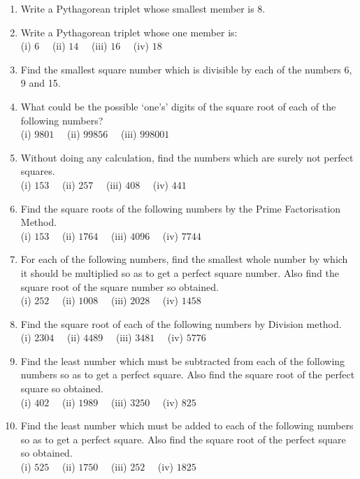 \documentclass[a4paper,leqno,12pt]{amsart}
\begin{document}
\begin{enumerate}
\item Write a Pythagorean triplet whose smallest member is 8.

\item Write a Pythagorean triplet whose one member is:\\
(i) $6 \quad $ (ii) $14 \quad$ (iii) $16 \quad$ (iv) $18$ 

\item Find the smallest square number which is divisible by each of the numbers 6, 9 and 15. 

\item What could be the possible ‘one’s’ digits of the square root of each of the following
numbers? \\
(i) $9801 \quad$ (ii) $99856 \quad$ (iii) $998001$

\item Without doing any calculation, find the numbers which are surely not perfect squares.\\
(i) $153 \quad$ (ii) $257 \quad$ (iii) $408 \quad$ (iv) $441$

\item Find the square roots of the following numbers by the Prime Factorisation Method.\\
(i) $153 \quad$ (ii) $1764 \quad$ (iii) $4096 \quad$ (iv) $7744$

\item For each of the following numbers, find the smallest whole number by which it should
be multiplied so as to get a perfect square number. Also find the square root of the
square number so obtained.\\
(i) $252 \quad$ (ii) $1008 \quad$ (iii) $2028 \quad$ (iv) $1458$

\item Find the square root of each of the following numbers by Division method.\\
(i) $2304 \quad$ (ii) $4489 \quad$ (iii) $3481 \quad$ (iv) $5776$

\item Find the least number which must be subtracted from each of the following numbers
so as to get a perfect square. Also find the square root of the perfect square so
obtained.\\
(i) $402 \quad$ (ii) $1989 \quad$ (iii) $3250 \quad$ (iv) $825$

\item Find the least number which must be added to each of the following numbers so as
to get a perfect square. Also find the square root of the perfect square so obtained.\\
(i) $525 \quad$ (ii) $1750 \quad$ (iii) $252 \quad$ (iv) $1825$


\end{enumerate}
\end{document}

